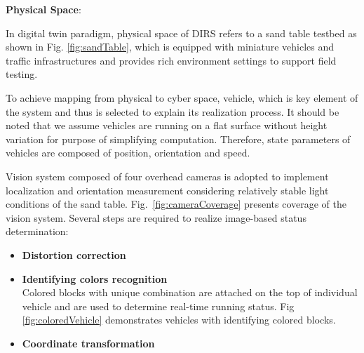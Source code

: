 \documentclass[conference]{IEEEtran}
\begin{document}
\par\textbf{Physical Space}:

	In digital twin paradigm, physical space of DIRS refers to a sand table testbed as shown in Fig. \ref{fig:sandTable}, which is equipped with miniature vehicles and traffic infrastructures and provides rich environment settings to support field testing.
	
	To achieve mapping from physical to cyber space, vehicle, which is key element of the system and thus is selected to explain its realization process. It should be noted that we assume vehicles are running on a flat surface without height variation for purpose of simplifying computation. Therefore, state parameters of vehicles are composed of position, orientation and speed. 
	
	Vision system composed of four overhead cameras is adopted to implement localization and orientation measurement considering relatively stable light conditions of the sand table. Fig.~\ref{fig:cameraCoverage} presents coverage of the vision system. Several steps are required to realize image-based status determination:
	\begin{itemize}
		\item \textbf{Distortion correction}
		\item \textbf{Identifying colors recognition}\\
		Colored blocks with unique combination are attached on the top of individual vehicle and are used to determine real-time running status. Fig \ref{fig:coloredVehicle} demonstrates vehicles with identifying colored blocks.
		\item \textbf{Coordinate transformation}
	\end{itemize}
\end{document}
